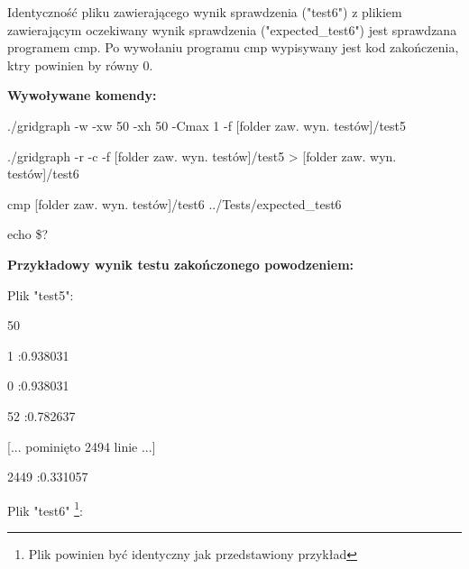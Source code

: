 \documentclass[11pt,a4paper]{report}
\def\console #1{\begingroup\fontfamily{qcr}\selectfont#1\endgroup}
\newenvironment{multiconsole}{\begingroup\fontfamily{qcr}\selectfont}{\endgroup}
\begin{document}
    Identyczność pliku zawierającego wynik sprawdzenia ("test6") z plikiem zawierającym oczekiwany wynik sprawdzenia ("expected\_test6") jest sprawdzana programem \console{cmp}. Po wywołaniu programu \console{cmp} wypisywany jest kod zakończenia, ktry powinien by równy 0.

    \vspace{2em}

    \textbf{Wywoływane komendy:}

    \vspace{1em}

    \begin{multiconsole}
        ./gridgraph -w -xw 50 -xh 50 -Cmax 1 -f [folder zaw. wyn. testów]/test5

        ./gridgraph -r -c -f [folder zaw. wyn. testów]/test5 > [folder zaw. wyn. testów]/test6

        cmp [folder zaw. wyn. testów]/test6 ../Tests/expected\_test6

        echo \$?
    \end{multiconsole}

    \vspace{2em}

    \textbf{Przykładowy wynik testu zakończonego powodzeniem:}

    \vspace{1em}

    Plik "test5":

    \begin{multiconsole}
        50 50

        \hspace{2em}1 :0.938031

        \hspace{2em}0 :0.938031 

        \hspace{2em}52 :0.782637

        [... pominięto 2494 linie ...]

        \hspace{2em}

        \hspace{2em}

        \hspace{2em}2449 :0.331057   
    \end{multiconsole}

    \vspace{1em}

    Plik "test6" \footnote{Plik powinien być identyczny jak przedstawiony przykład}:
\end{document}
